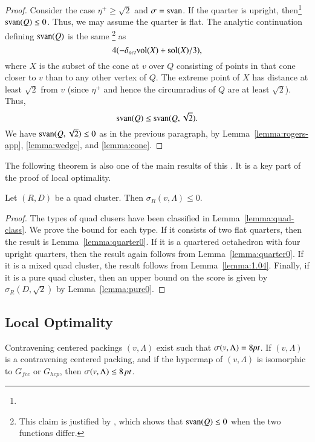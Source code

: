 \begin{proof}
Consider the case $\eta^+\ge\sqrt2$ and $\sigma={\operatorname{svan}}$. If the
quarter is upright, then\footnote{} ${\operatorname{svan}}(Q)\le0$.
Thus, we may assume the quarter is flat.  
The
analytic continuation defining ${\operatorname{svan}}(Q)$ is the same
\footnote{This claim is justified by , which
shows that ${\operatorname{svan}}(Q)\le0$ when the two functions differ.} as
    $$4(-\delta_{oct}{\operatorname{vol}}(X) + \operatorname{sol}(X)/3),$$
where $X$ is the subset of the cone at $v$ over $Q$ consisting of
points in that cone closer to $v$ than to any other vertex of $Q$.
The extreme point of $X$ has distance at least $\sqrt2$ from $v$
(since $\eta^+$ and hence the circumradius of $Q$ are at least
$\sqrt2$).  Thus,
    $${\operatorname{svan}}(Q) \le {\operatorname{svan}}(Q,\sqrt2).$$
We have ${\operatorname{svan}}(Q,\sqrt2)\le0$ as in the previous paragraph, by
Lemma~\ref{lemma:rogers-app}, \ref{lemma:wedge}, and
\ref{lemma:cone}.
\end{proof}



The following theorem is also one of the main results of this
\chap. It is a key part of the proof of local optimality.


\begin{theorem}\label{lemma:quad0} Let $(R,D)$ be a quad cluster.
Then $\sigma_R(v,\Lambda)\le 0$.
\end{theorem}

\begin{proof}
The types of quad clusers have been classified in Lemma~\ref{lemma:quad-class}.
We prove the bound for each type.
If it consists of two flat quarters, then the result is
Lemma~\ref{lemma:quarter0}.  If it is a quartered octahedron with
four upright quarters, then the result again follows from
Lemma~\ref{lemma:quarter0}.  If it is a mixed quad cluster,
the result follows from Lemma~\ref{lemma:1.04}.  Finally,
if it is a pure quad cluster, then an upper bound on the score
is given by $\sigma_R(D,\sqrt2)$ by Lemma~\ref{lemma:pure0}.  
\end{proof}







\subsection{Local Optimality}%
\label{sec:local-opt}

\begin{lemma}  %
Contravening centered packings $(v,\Lambda)$ exist such that
$\sigma(v,\Lambda)=8\hbox{\it pt}$. If $(v,\Lambda)$ is a contravening centered packing, and
if the hypermap of $(v,\Lambda)$ is isomorphic to $G_{fcc}$ or $G_{hcp}$,
then $\sigma(v,\Lambda) \le 8\,\hbox{\it pt}$.
\end{lemma} %

